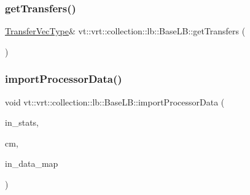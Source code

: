 \mbox{\label{structvt_1_1vrt_1_1collection_1_1lb_1_1_base_l_b_ace9ba67a70c21b1198feee35827eea11}} 
\subsubsection{\texorpdfstring{get\+Transfers()}{getTransfers()}}
{\footnotesize\ttfamily \hyperlink{structvt_1_1vrt_1_1collection_1_1lb_1_1_base_l_b_a329e8179ec41a1bd4924c79fe23a79af}{Transfer\+Vec\+Type}\& vt\+::vrt\+::collection\+::lb\+::\+Base\+L\+B\+::get\+Transfers (\begin{DoxyParamCaption}{ }\end{DoxyParamCaption})\hspace{0.3cm}{\ttfamily [inline]}}

\mbox{\label{structvt_1_1vrt_1_1collection_1_1lb_1_1_base_l_b_acdf39bf5a6d72d1f9e36c9a0508992fc}} 
\subsubsection{\texorpdfstring{import\+Processor\+Data()}{importProcessorData()}}
{\footnotesize\ttfamily void vt\+::vrt\+::collection\+::lb\+::\+Base\+L\+B\+::import\+Processor\+Data (\begin{DoxyParamCaption}\item[{\hyperlink{structvt_1_1vrt_1_1collection_1_1lb_1_1_base_l_b_acd9bdad961ac83c96b7a227de672f96c}{Statistic\+Map\+Type} const \&}]{in\+\_\+stats,  }\item[{\hyperlink{structvt_1_1vrt_1_1collection_1_1lb_1_1_base_l_b_a83eb4daec14edfb8780422e95b8e38d3}{Element\+Comm\+Type} const \&}]{cm,  }\item[{\hyperlink{namespacevt_1_1vrt_1_1collection_1_1balance_a5794b6bc763c88c78228074bd0d1a50f}{balance\+::\+Data\+Map\+Type} const \&}]{in\+\_\+data\+\_\+map }\end{DoxyParamCaption})}




